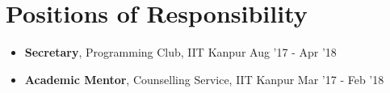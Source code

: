 \newcommand{\por}[3]{\textbf{#1}, #2 \hfill #3}

\section*{Positions of Responsibility}
\begin{itemize}

\setlength\itemsep{0pt}
\item \por{Secretary}{Programming Club, IIT Kanpur}{Aug '17 - Apr '18}
\item \por{Academic Mentor}{Counselling Service, IIT Kanpur}{Mar '17 - Feb '18}

\end{itemize}
